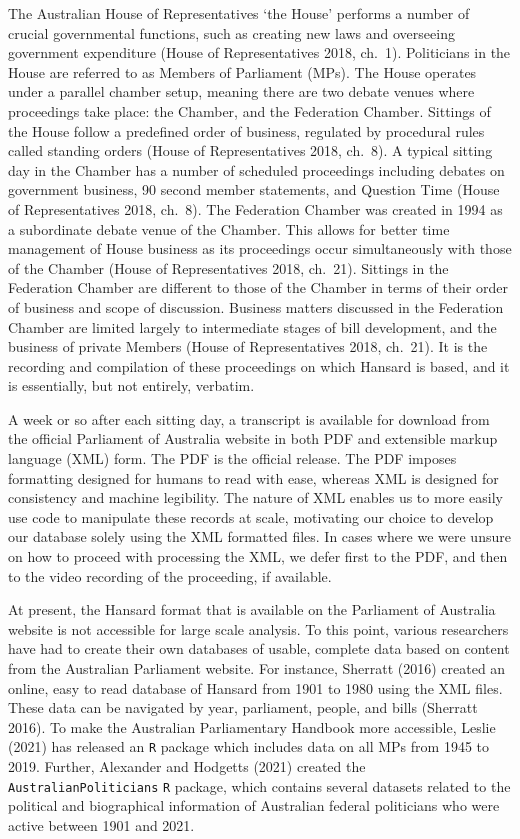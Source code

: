 \documentclass[
  letterpaper,
  DIV=11,
  numbers=noendperiod]{scrartcl}
\begin{document}
The Australian House of Representatives `the House' performs a number of
crucial governmental functions, such as creating new laws and overseeing
government expenditure (House of Representatives 2018, ch.~1).
Politicians in the House are referred to as Members of Parliament (MPs).
The House operates under a parallel chamber setup, meaning there are two
debate venues where proceedings take place: the Chamber, and the
Federation Chamber. Sittings of the House follow a predefined order of
business, regulated by procedural rules called standing orders (House of
Representatives 2018, ch.~8). A typical sitting day in the Chamber has a
number of scheduled proceedings including debates on government
business, 90 second member statements, and Question Time (House of
Representatives 2018, ch.~8). The Federation Chamber was created in 1994
as a subordinate debate venue of the Chamber. This allows for better
time management of House business as its proceedings occur
simultaneously with those of the Chamber (House of Representatives 2018,
ch.~21). Sittings in the Federation Chamber are different to those of
the Chamber in terms of their order of business and scope of discussion.
Business matters discussed in the Federation Chamber are limited largely
to intermediate stages of bill development, and the business of private
Members (House of Representatives 2018, ch.~21). It is the recording and
compilation of these proceedings on which Hansard is based, and it is
essentially, but not entirely, verbatim.

A week or so after each sitting day, a transcript is available for
download from the official Parliament of Australia website in both PDF
and extensible markup language (XML) form. The PDF is the official
release. The PDF imposes formatting designed for humans to read with
ease, whereas XML is designed for consistency and machine legibility.
The nature of XML enables us to more easily use code to manipulate these
records at scale, motivating our choice to develop our database solely
using the XML formatted files. In cases where we were unsure on how to
proceed with processing the XML, we defer first to the PDF, and then to
the video recording of the proceeding, if available.

At present, the Hansard format that is available on the Parliament of
Australia website is not accessible for large scale analysis. To this
point, various researchers have had to create their own databases of
usable, complete data based on content from the Australian Parliament
website. For instance, Sherratt (2016) created an online, easy to read
database of Hansard from 1901 to 1980 using the XML files. These data
can be navigated by year, parliament, people, and bills (Sherratt 2016).
To make the Australian Parliamentary Handbook more accessible, Leslie
(2021) has released an \texttt{R} package which includes data on all MPs
from 1945 to 2019. Further, Alexander and Hodgetts (2021) created the
\texttt{AustralianPoliticians} \texttt{R} package, which contains
several datasets related to the political and biographical information
of Australian federal politicians who were active between 1901 and 2021.
\end{document}
